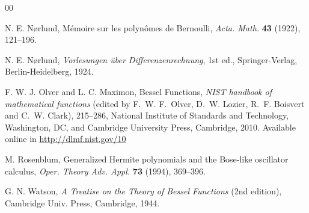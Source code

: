 \documentclass[10pt]{article}
\theoremstyle{plain}
\theoremstyle{definition}
\numberwithin{equation}{section} %
\begin{document}
\begin{thebibliography}{00}



N. E. N{\o}rlund, %
M\'emoire sur les polyn\^omes de Bernoulli,
\textit{Acta. Math.} 
\textbf{43} (1922), 121--196.

N. E. N{\o}rlund, %
\textit{Vorlesungen \"uber Differenzenrechnung}, 1st ed., 
Springer-Verlag, Berlin-Heidelberg, 1924.

F. W. J. Olver and L. C. Maximon,
Bessel Functions,
\textit{NIST handbook of mathematical functions}
(edited by F.~W. F.~Olver, D.~W. Lozier, R.~F. Boisvert and C.~W. Clark),
215--286, %
National Institute of Standards and Technology, Washington, DC, and
Cambridge University Press, Cambridge, 2010.
Available online in \url{http://dlmf.nist.gov/10}



M. Rosenblum,
{Generalized Hermite polynomials and the Bose-like oscillator calculus},
\textit{Oper. Theory Adv. Appl.}
\textbf{73} (1994), 369--396.




G. N. Watson,
\textit{A Treatise on the Theory of Bessel Functions} (2nd edition),
Cambridge Univ. Press,
Cambridge, 1944.

\end{thebibliography}

\end{document}
